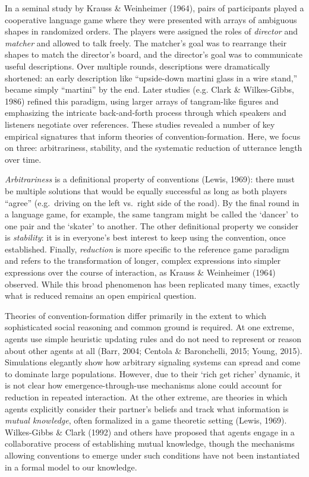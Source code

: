 \documentclass[manuscript]{stjour}
\begin{document}
In a seminal study by Krauss \& Weinheimer (1964), pairs of participants
played a cooperative language game where they were presented with arrays
of ambiguous shapes in randomized orders. The players were assigned the
roles of \emph{director} and \emph{matcher} and allowed to talk freely.
The matcher's goal was to rearrange their shapes to match the director's
board, and the director's goal was to communicate useful descriptions.
Over multiple rounds, descriptions were dramatically shortened: an early
description like ``upside-down martini glass in a wire stand,'' became
simply ``martini'' by the end. Later studies (e.g. Clark \&
Wilkes-Gibbs, 1986) refined this paradigm, using larger arrays of
tangram-like figures and emphasizing the intricate back-and-forth
process through which speakers and listeners negotiate over references.
These studies revealed a number of key empirical signatures that inform
theories of convention-formation. Here, we focus on three:
arbitrariness, stability, and the systematic reduction of utterance
length over time.

\emph{Arbitrariness} is a definitional property of conventions (Lewis,
1969): there must be multiple solutions that would be equally successful
as long as both players ``agree'' (e.g.~driving on the left vs.~right
side of the road). By the final round in a language game, for example,
the same tangram might be called the `dancer' to one pair and the
`skater' to another. The other definitional property we consider is
\emph{stability}: it is in everyone's best interest to keep using the
convention, once established. Finally, \emph{reduction} is more specific
to the reference game paradigm and refers to the transformation of
longer, complex expressions into simpler expressions over the course of
interaction, as Krauss \& Weinheimer (1964) observed. While this broad
phenomenon has been replicated many times, exactly what is reduced
remains an open empirical question.

Theories of convention-formation differ primarily in the extent to which
sophisticated social reasoning and common ground is required. At one
extreme, agents use simple heuristic updating rules and do not need to
represent or reason about other agents at all (Barr, 2004; Centola \&
Baronchelli, 2015; Young, 2015). Simulations elegantly show how
arbitrary signaling systems can spread and come to dominate large
populations. However, due to their `rich get richer' dynamic, it is not
clear how emergence-through-use mechanisms alone could account for
reduction in repeated interaction. At the other extreme, are theories in
which agents explicitly consider their partner's beliefs and track what
information is \emph{mutual knowledge}, often formalized in a game
theoretic setting (Lewis, 1969). Wilkes-Gibbs \& Clark (1992) and others
have proposed that agents engage in a collaborative process of
establishing mutual knowledge, though the mechanisms allowing
conventions to emerge under such conditions have not been instantiated
in a formal model to our knowledge.
\end{document}
